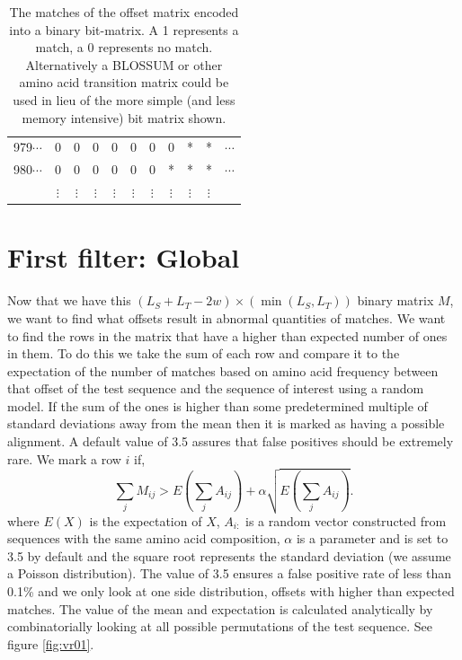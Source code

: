 \documentclass[phd,tocprelim]{cornell}
\begin{document}
\begin{table}[htp]
\begin{center}
{\begin{tabular}{|ccccccccccc|}
\small{979}$\cdots$ & 0 & 0 & 0 & 0 & 0 & 0 & 0 & * & * & $\cdots$ \\
\small{980}$\cdots$ & 0 & 0 & 0 & 0 & 0 & 0 & * & * & * & $\cdots$ \\
 & $\vdots$ &  $\vdots$ &  $\vdots$ &  $\vdots$ & $\vdots$ &  $\vdots$ &  $\vdots$ &  $\vdots$&  $\vdots$ & \\
\hline
\end{tabular}
}
\end{center}
\caption[Velvetrope offset bit-matrix]{The matches of the offset matrix encoded into a binary bit-matrix. A 1 represents a match, a 0 represents no match. Alternatively a BLOSSUM or other amino acid transition matrix could be used in lieu of the more simple (and less memory intensive) bit matrix shown.}
\end{table}

\section{First filter: Global}

Now that we have this $(L_{S} + L_{T}-2w) \times (\min(L_{S},L_{T}))$ binary matrix $M$, we want to find what offsets result in abnormal quantities of matches. We want to find the rows in the matrix that have a higher than expected number of ones in them. To do this we take the sum of each row and compare it to the expectation of the number of matches based on amino acid frequency between that offset of the test sequence and the sequence of interest using a random model. If the sum of the ones is higher than some predetermined multiple of standard deviations away from the mean then it is marked as having a possible alignment. A default value of 3.5 assures that false positives should be extremely rare. We mark a row $i$ if,
\begin{equation}
    \sum_{j} M_{ij} > E\left(\sum_{j} A_{ij}\right) + \alpha \sqrt{E\left(\sum_{j} A_{ij}\right)}.
\end{equation}
where $E(X)$ is the expectation of $X$, $A_{i:}$ is a random vector constructed from sequences with the same amino acid composition, $\alpha$ is a parameter and is set to 3.5 by default and the square root represents the standard deviation (we assume a Poisson distribution). The value of 3.5 ensures a false positive rate of less than 0.1\% and we only look at one side distribution, offsets with higher than expected matches. The value of the mean and expectation is calculated analytically by combinatorially looking at all possible permutations of the test sequence. See figure \ref{fig:vr01}.
\end{document}
